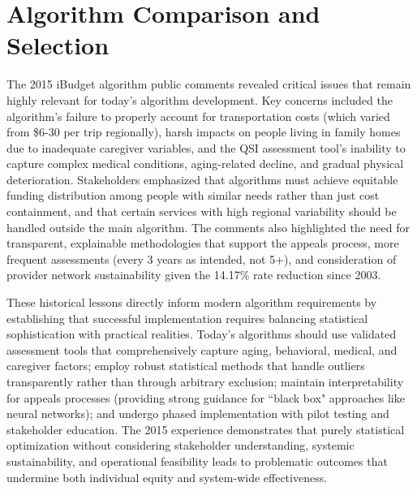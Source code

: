 \chapter{Algorithm Comparison and Selection}  \newpage

The 2015 iBudget algorithm public comments revealed critical issues that remain highly relevant for today's algorithm development. Key concerns included the algorithm's failure to properly account for transportation costs (which varied from \$6-30 per trip regionally), harsh impacts on people living in family homes due to inadequate caregiver variables, and the QSI assessment tool's inability to capture complex medical conditions, aging-related decline, and gradual physical deterioration. Stakeholders emphasized that algorithms must achieve equitable funding distribution among people with similar needs rather than just cost containment, and that certain services with high regional variability should be handled outside the main algorithm. The comments also highlighted the need for transparent, explainable methodologies that support the appeals process, more frequent assessments (every 3 years as intended, not 5+), and consideration of provider network sustainability given the 14.17\% rate reduction since 2003.

These historical lessons directly inform modern algorithm requirements by establishing that successful implementation requires balancing statistical sophistication with practical realities. Today's algorithms should use validated assessment tools that comprehensively capture aging, behavioral, medical, and caregiver factors; employ robust statistical methods that handle outliers transparently rather than through arbitrary exclusion; maintain interpretability for appeals processes (providing strong guidance for ``black box" approaches like neural networks); and undergo phased implementation with pilot testing and stakeholder education. The 2015 experience demonstrates that purely statistical optimization without considering stakeholder understanding, systemic sustainability, and operational feasibility leads to problematic outcomes that undermine both individual equity and system-wide effectiveness.